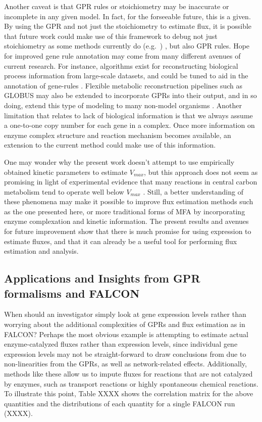 Another caveat is that GPR rules or stoichiometry may be inaccurate or
incomplete in any given model. In fact, for the forseeable future,
this is a given. By using the GPR and not just the stoichiometry to
estimate flux, it is possible that future work could make use of this
framework to debug not just stoichiometry as some methods currently do
(e.g.\ \citealt{Reed14112006}) , but also GPR rules.  Hope for
improved gene rule annotation may come from many different avenues of
current research. For instance, algorithms exist for reconstructing
biological process information from large-scale datasets, and
could be tuned to aid in the annotation of gene-rules
\citep{Mitra2013}. Flexible metabolic reconstruction pipelines such as
GLOBUS may also be extended to incorporate GPRs into their output, and
in so doing, extend this type of modeling to many non-model organisms
\citep{Plata2012}.  Another limitation that relates to lack of
biological information is that we always assume a one-to-one copy
number for each gene in a complex. Once more information on enzyme
complex structure and reaction mechanism becomes available, an
extension to the current method could make use of this information.


One may wonder why the present work doesn't attempt to use empirically
obtained kinetic parameters to estimate $V_{max}$, but this approach
does not seem as promising in light of experimental evidence that many
reactions in central carbon metabolism tend to operate well below
$V_{max}$ \citep{Bennett2009}. Still, a better understanding of these
phenomena may make it possible to improve flux estimation methods such
as the one presented here, or more traditional forms of MFA
\citep{Shestov2013a} by incorporating enzyme complexation and kinetic
information. The present results and avenues for future improvement
show that there is much promise for using expression to estimate
fluxes, and that it can already be a useful tool for performing flux
estimation and analysis.


\subsection{Applications and Insights from GPR formalisms and FALCON}
When should an investigator simply look at gene expression levels rather than
worrying about the additional complexities of GPRs and flux estimation as in FALCON?
Perhaps the most obvious example is attempting to estimate actual enzyme-catalyzed 
fluxes rather than expression levels, since individual gene expression levels
may not be straight-forward to draw conclusions from due to non-linearities
from the GPRs, as well as network-related effects. Additionally, methods like these
allow us to impute fluxes for reactions that are not catalyzed by enzymes,
such as transport reactions or highly spontaneous chemical reactions. To illustrate
this point, Table XXXX shows the correlation matrix for the above quantities and 
the distributions of each quantity for a single FALCON run (XXXX).


